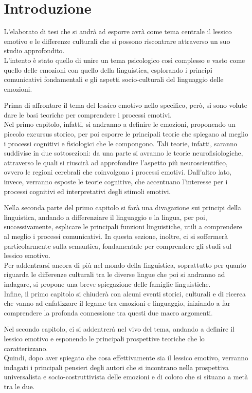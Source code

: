 \chapter{Introduzione}

L'elaborato di tesi che si andrà ad esporre avrà come tema centrale il lessico emotivo e le differenze culturali che si possono riscontrare attraverso un suo studio approfondito. \\
L'intento è stato quello di unire un tema psicologico così complesso e vasto come quello delle emozioni con quello della linguistica, esplorando i principi comunicativi fondamentali e gli aspetti socio-culturali del linguaggio delle emozioni. 

Prima di affrontare il tema del lessico emotivo nello specifico, però, si sono volute dare le basi teoriche per comprendere i processi emotivi. \\
Nel primo capitolo, infatti, si andranno a definire le emozioni, proponendo un piccolo excursus storico, per poi esporre le principali teorie che spiegano al meglio i processi cognitivi e fisiologici che le compongono. Tali teorie, infatti, saranno suddivise in due sottosezioni: da una parte si avranno le teorie neurofisiologiche, attraverso le quali si riuscirà ad approfondire l'aspetto più neuroscientifico, ovvero le regioni cerebrali che coinvolgono i processi emotivi. Dall'altro lato, invece, verranno esposte le teorie cognitive, che accentuano l'interesse per i processi cognitivi ed interpretativi degli stimoli emotivi. 

Nella seconda parte del primo capitolo si farà una divagazione sui principi della linguistica, andando a differenziare il linguaggio e la lingua, per poi, successivamente, esplicare le principali funzioni linguistiche, utili a comprendere al meglio i processi comunicativi. In questa sezione, inoltre, ci si soffermerà particolarmente sulla semantica, fondamentale per comprendere gli studi sul lessico emotivo.\\
Per addentrarsi ancora di più nel mondo della linguistica, soprattutto per quanto riguarda le differenze culturali tra le diverse lingue che poi si andranno ad indagare, si propone una breve spiegazione delle famiglie linguistiche. \\
Infine, il primo capitolo si chiuderà con alcuni eventi storici, culturali e di ricerca che vanno ad enfatizzare il legame tra emozioni e linguaggio, iniziando a far comprendere la profonda connessione tra questi due macro argomenti. 

Nel secondo capitolo, ci si addentrerà nel vivo del tema, andando a definire il lessico emotivo e esponendo le principali prospettive teoriche che lo caratterizzano. \\
Quindi, dopo aver spiegato che cosa effettivamente sia il lessico emotivo, verranno indagati i principali pensieri degli autori che si incontrano nella prospettiva universalista e socio-costruttivista delle emozioni e di coloro che si situano a metà tra le due. 


